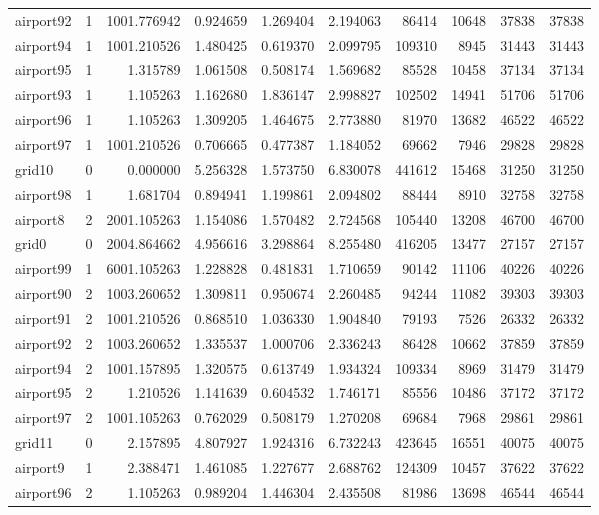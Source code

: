 \begin{longtable}{|l|r|r|r|r|r|r|r|r|r|}
airport92 & 1 & 1001.776942 & 0.924659 & 1.269404 & 2.194063 & 86414 & 10648 & 37838 & 37838 \\
airport94 & 1 & 1001.210526 & 1.480425 & 0.619370 & 2.099795 & 109310 & 8945 & 31443 & 31443 \\
airport95 & 1 & 1.315789 & 1.061508 & 0.508174 & 1.569682 & 85528 & 10458 & 37134 & 37134 \\
airport93 & 1 & 1.105263 & 1.162680 & 1.836147 & 2.998827 & 102502 & 14941 & 51706 & 51706 \\
airport96 & 1 & 1.105263 & 1.309205 & 1.464675 & 2.773880 & 81970 & 13682 & 46522 & 46522 \\
airport97 & 1 & 1001.210526 & 0.706665 & 0.477387 & 1.184052 & 69662 & 7946 & 29828 & 29828 \\
grid10 & 0 & 0.000000 & 5.256328 & 1.573750 & 6.830078 & 441612 & 15468 & 31250 & 31250 \\
airport98 & 1 & 1.681704 & 0.894941 & 1.199861 & 2.094802 & 88444 & 8910 & 32758 & 32758 \\
airport8 & 2 & 2001.105263 & 1.154086 & 1.570482 & 2.724568 & 105440 & 13208 & 46700 & 46700 \\
grid0 & 0 & 2004.864662 & 4.956616 & 3.298864 & 8.255480 & 416205 & 13477 & 27157 & 27157 \\
airport99 & 1 & 6001.105263 & 1.228828 & 0.481831 & 1.710659 & 90142 & 11106 & 40226 & 40226 \\
airport90 & 2 & 1003.260652 & 1.309811 & 0.950674 & 2.260485 & 94244 & 11082 & 39303 & 39303 \\
airport91 & 2 & 1001.210526 & 0.868510 & 1.036330 & 1.904840 & 79193 & 7526 & 26332 & 26332 \\
airport92 & 2 & 1003.260652 & 1.335537 & 1.000706 & 2.336243 & 86428 & 10662 & 37859 & 37859 \\
airport94 & 2 & 1001.157895 & 1.320575 & 0.613749 & 1.934324 & 109334 & 8969 & 31479 & 31479 \\
airport95 & 2 & 1.210526 & 1.141639 & 0.604532 & 1.746171 & 85556 & 10486 & 37172 & 37172 \\
airport97 & 2 & 1001.105263 & 0.762029 & 0.508179 & 1.270208 & 69684 & 7968 & 29861 & 29861 \\
grid11 & 0 & 2.157895 & 4.807927 & 1.924316 & 6.732243 & 423645 & 16551 & 40075 & 40075 \\
airport9 & 1 & 2.388471 & 1.461085 & 1.227677 & 2.688762 & 124309 & 10457 & 37622 & 37622 \\
airport96 & 2 & 1.105263 & 0.989204 & 1.446304 & 2.435508 & 81986 & 13698 & 46544 & 46544 \\

\end{longtable}
